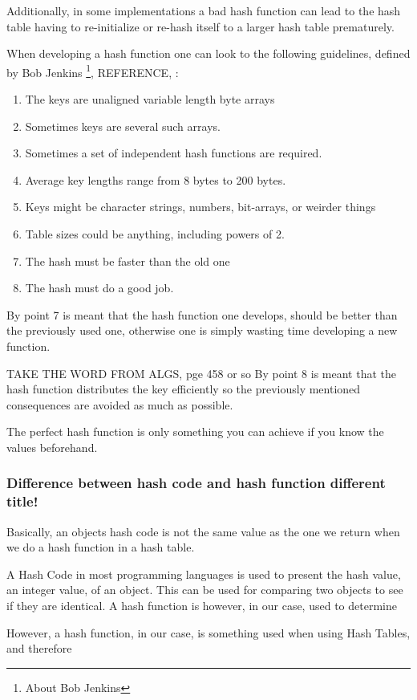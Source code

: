 \documentclass[titlepage]{article}
\begin{document}
	Additionally, in some implementations a bad hash function can lead to the hash table having to re-initialize or re-hash itself to a larger hash table prematurely. 
	
	When developing a hash function one can look to the following guidelines, defined by Bob Jenkins \footnote{About Bob Jenkins}, REFERENCE, :
	\begin{enumerate}
		\item The keys are unaligned variable length byte arrays
		\item Sometimes keys are several such arrays.
		\item Sometimes a set of independent hash functions are required.
		\item Average key lengths range from 8 bytes to 200 bytes.
		\item Keys might be character strings, numbers, bit-arrays, or weirder things
		\item Table sizes could be anything, including powers of 2.
		\item The hash must be faster than the old one
		\item The hash must do a good job.
	\end{enumerate} 
	
	By point 7 is meant that the hash function one develops, should be better than the previously used one, otherwise one is simply wasting time developing a new function. 
	
		TAKE THE WORD FROM ALGS, pge 458 or so
	By point 8 is meant that the hash function distributes the key efficiently so the previously mentioned consequences are avoided as much as possible. 
	
	The perfect hash function is only something you can achieve if you know the values beforehand. 
	
	\subsubsection{Difference between hash code and hash function different title!} 
	Basically, an objects hash code is not the same value as the one we return when we do a hash function in a hash table.
	
	A Hash Code in most programming languages is used to present the hash value, an integer value, of an object. This can be used for comparing two objects to see if they are identical.  A hash function is however, in our case, used to determine 
	
	However, a hash function, in our case, is something used when using Hash Tables, and therefore 
	
\end{document}
